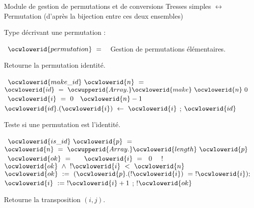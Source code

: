 \documentclass[12pt]{article}
\begin{document}
\allowbreak\ocwsection
\label{Permutation.ml:0}%
Module de gestion de permutations et de conversions 
   Tresses simples $\leftrightarrow$ Permutation (d'après la bijection entre 
   ces deux ensembles)

\ocweol
\ocwindent{0.00em}
Type décrivant une permutation :

\ocweol
\label{Permutation.ml:299}%
\medskip
\ocwbegincode{}\ocwindent{0.00em}
~$\ocwlowerid{permutation}~=~$~\ocweol
\ocwendcode{}\allowbreak\ocwsection
\label{Permutation.ml:333}%
Gestion de permutations élémentaires.

\ocweol
\ocwindent{0.00em}
Retourne la permutation identité.

\ocweol
\label{Permutation.ml:420}%
\medskip
\ocwbegincode{}\ocwindent{0.00em}
~$\ocwlowerid{make\_id}~\ocwlowerid{n}~=$\ocweol
\ocwindent{2.00em}
~$\ocwlowerid{id}~=~\ocwupperid{Array.}\ocwlowerid{make}~\ocwlowerid{n}~0~$\ocweol
\ocwindent{2.00em}
~$\ocwlowerid{i}~=~0~$~$\ocwlowerid{n}-1~$\ocweol
\ocwindent{4.00em}
$\ocwlowerid{id}.(\ocwlowerid{i})~\leftarrow{}~\ocwlowerid{i}$\ocweol
\ocwindent{2.00em}
;\ocweol
\ocwindent{2.00em}
$\ocwlowerid{id}$\medskip

\ocwendcode{}\ocwindent{0.00em}
Teste si une permutation est l'identité.

\ocweol
\label{Permutation.ml:579}%
\medskip
\ocwbegincode{}\ocwindent{0.00em}
~$\ocwlowerid{is\_id}~\ocwlowerid{p}~=$\ocweol
\ocwindent{1.00em}
~$\ocwlowerid{n}~=~\ocwupperid{Array.}\ocwlowerid{length}~\ocwlowerid{p}~$\ocweol
\ocwindent{1.00em}
~$\ocwlowerid{ok}~=~$~~~$\ocwlowerid{i}~=~$~0~\ocweol
\ocwindent{1.00em}
~!$\ocwlowerid{ok}~\land{}~!\ocwlowerid{i}~<~\ocwlowerid{n}~$\ocweol
\ocwindent{2.00em}
$\ocwlowerid{ok}~:=~(\ocwlowerid{p}.(!\ocwlowerid{i})~=~!\ocwlowerid{i});$\ocweol
\ocwindent{2.00em}
$\ocwlowerid{i}~:=~!\ocwlowerid{i}+1$\ocweol
\ocwindent{1.00em}
;\ocweol
\ocwindent{1.00em}
!$\ocwlowerid{ok}$\medskip

\ocwendcode{}\ocwindent{0.00em}
Retourne la transposition $(i, j)$.
\end{document}
